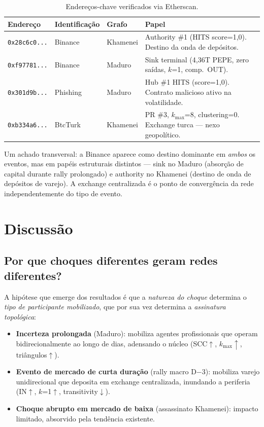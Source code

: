 \documentclass[12pt,a4paper]{article}
\begin{document}
\begin{table}[H]
\centering
\caption{Endereços-chave verificados via Etherscan.}
\label{tab:agentes}
\small
\begin{tabular}{p{2.5cm}llp{5.5cm}}
\toprule
Endereço & Identificação & Grafo & Papel \\
\midrule
\texttt{0x28c6c0...} & Binance & Khamenei & Authority \#1 (HITS score=1,0). Destino da onda de depósitos. \\
\texttt{0xf97781...} & Binance & Maduro & Sink terminal (4,36T PEPE, zero saídas, $k$=1, comp.\ OUT). \\
\texttt{0x301d9b...} & Phishing & Maduro & Hub \#1 HITS (score=1,0). Contrato malicioso ativo na volatilidade. \\
\texttt{0xb334a6...} & BtcTurk & Khamenei & PR \#3, $k_{\max}$=8, clustering=0. Exchange turca --- nexo geopolítico. \\
\bottomrule
\end{tabular}
\end{table}

Um achado transversal: a Binance aparece como destino dominante em \textit{ambos} os eventos, mas em papéis estruturais distintos --- sink no Maduro (absorção de capital durante rally prolongado) e authority no Khamenei (destino de onda de depósitos de varejo). A exchange centralizada é o ponto de convergência da rede independentemente do tipo de evento.

\section{Discussão}

\subsection{Por que choques diferentes geram redes diferentes?}

A hipótese que emerge dos resultados é que a \textit{natureza do choque} determina o \textit{tipo de participante mobilizado}, que por sua vez determina a \textit{assinatura topológica}:

\begin{itemize}[nosep]
\item \textbf{Incerteza prolongada} (Maduro): mobiliza agentes profissionais que operam bidirecionalmente ao longo de dias, adensando o núcleo (SCC$\uparrow$, $k_{\max}\uparrow$, triângulos$\uparrow$).
\item \textbf{Evento de mercado de curta duração} (rally macro D$-$3): mobiliza varejo unidirecional que deposita em exchange centralizada, inundando a periferia (IN$\uparrow$, $k$=1$\uparrow$, transitivity$\downarrow$).
\item \textbf{Choque abrupto em mercado de baixa} (assassinato Khamenei): impacto limitado, absorvido pela tendência existente.
\end{itemize}
\end{document}
